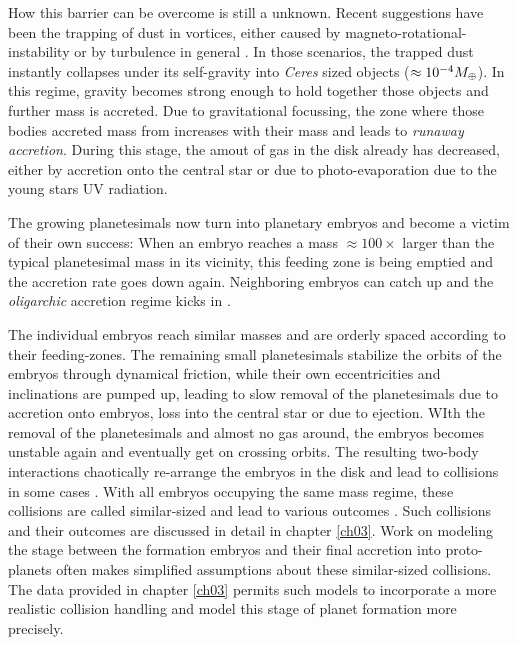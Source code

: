How this barrier can be overcome is still a unknown. Recent suggestions have been the trapping of dust in vortices, either caused by magneto-rotational-instability \citep{Johansen:2007p37} or by turbulence in general \citep{2008ApJ...686.1292I}. In those scenarios, the trapped dust instantly collapses under its self-gravity into \emph{Ceres} sized objects ($\approx 10^{-4} M_{\oplus}$). In this regime, gravity becomes strong enough to hold together those objects and further mass is accreted. Due to gravitational focussing, the zone where those bodies accreted mass from increases with their mass and leads to \emph{runaway accretion}. During this stage, the amout of gas in the disk already has decreased, either by accretion onto the central star or due to photo-evaporation due to the young stars UV radiation.

The growing planetesimals now turn into planetary embryos and become a victim of their own success: When an embryo reaches a mass $\approx 100\times$ larger than the typical planetesimal mass in its vicinity, this feeding zone is being emptied and the accretion rate goes down again. Neighboring embryos can catch up and the \emph{oligarchic} accretion regime kicks in \citep{1993Icar..106..210I, 2010ApJ...714L.103O}.

The individual embryos reach similar masses and are orderly spaced according to their feeding-zones. The remaining small planetesimals stabilize the orbits of the embryos through dynamical friction, while their own eccentricities and inclinations are pumped up, leading to slow removal of the planetesimals due to accretion onto embryos, loss into the central star or due to ejection. WIth the removal of the planetesimals and almost no gas around, the embryos becomes unstable again and eventually get on crossing orbits. The resulting two-body interactions chaotically re-arrange the embryos in the disk and lead to collisions in some cases \cite{Chambers:2001p2105, Chambers:2004p4098}. With all embryos occupying the same mass regime, these collisions are called similar-sized and lead to various outcomes \cite{Asphaug:2010p3539}. Such collisions and their outcomes are discussed in detail in chapter \ref{ch03}. Work on modeling the stage between the formation embryos and their final accretion into proto-planets \cite{Chambers:2001p2105, 2006Icar..184...39O} often makes simplified assumptions about these similar-sized collisions. The data provided in chapter \ref{ch03} permits such models to incorporate a more realistic collision handling and model this stage of planet formation more precisely.

